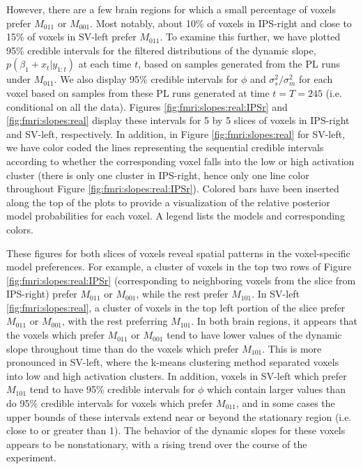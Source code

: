 However, there are a few brain regions for which a small percentage of voxels prefer $M_{011}$ or $M_{001}$. Most notably, about 10\% of voxels in IPS-right and close to 15\% of voxels in SV-left prefer $M_{011}$. To examine this further, we have plotted 95\% credible intervals for the filtered distributions of the dynamic slope, $p(\beta_1 + x_t|y_{1:t})$ at each time $t$, based on samples generated from the PL runs under $M_{011}$. We also display 95\% credible intervals for $\phi$ and $\sigma^2_s / \sigma^2_m$ for each voxel based on samples from these PL runs generated at time $t = T = 245$ (i.e. conditional on all the data). Figures \ref{fig:fmri:slopes:real:IPSr} and \ref{fig:fmri:slopes:real} display these intervals for 5 by 5 slices of voxels in IPS-right and SV-left, respectively. In addition, in Figure \ref{fig:fmri:slopes:real} for SV-left, we have color coded the lines representing the sequential credible intervals according to whether the corresponding voxel falls into the low or high activation cluster (there is only one cluster in IPS-right, hence only one line color throughout Figure \ref{fig:fmri:slopes:real:IPSr}). Colored bars have been inserted along the top of the plots to provide a visualization of the relative posterior model probabilities for each voxel. A legend lists the models and corresponding colors.

These figures for both slices of voxels reveal spatial patterns in the voxel-specific model preferences. For example, a cluster of voxels in the top two rows of Figure \ref{fig:fmri:slopes:real:IPSr} (corresponding to neighboring voxels from the slice from IPS-right) prefer $M_{011}$ or $M_{001}$, while the rest prefer $M_{101}$. In SV-left \ref{fig:fmri:slopes:real}, a cluster of voxels in the top left portion of the slice prefer $M_{011}$ or $M_{001}$, with the rest preferring $M_{101}$. In both brain regions, it appears that the voxels which prefer $M_{011}$ or $M_{001}$ tend to have lower values of the dynamic slope throughout time than do the voxels which prefer $M_{101}$. This is more pronounced in SV-left, where the k-means clustering method separated voxels into low and high activation clusters. In addition, voxels in SV-left which prefer $M_{101}$ tend to have 95\% credible intervals for $\phi$ which contain larger values than do 95\% credible intervals for voxels which prefer $M_{011}$, and in some cases the upper bounds of these intervals extend near or beyond the stationary region (i.e. close to or greater than 1). The behavior of the dynamic slopes for these voxels appears to be nonstationary, with a rising trend over the course of the experiment.

